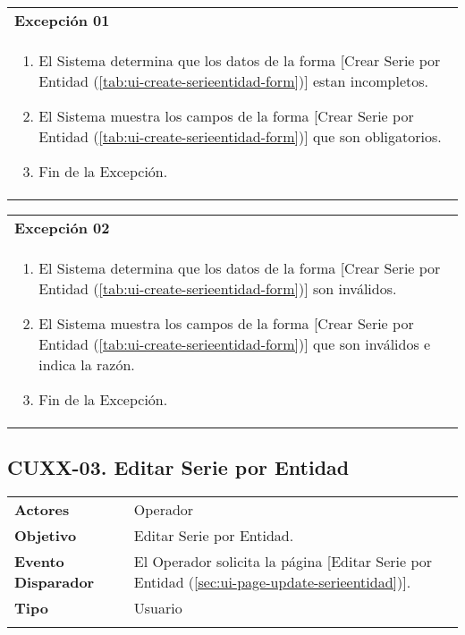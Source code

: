 \begin{tabular}{ p{15.5cm} }
	\textbf{Excepción 01} \\
	\begin{enumerate}
		\item El Sistema determina que los datos de la forma [Crear Serie por Entidad (\ref{tab:ui-create-serieentidad-form})] estan incompletos.
		\item El Sistema muestra los campos de la forma [Crear Serie por Entidad (\ref{tab:ui-create-serieentidad-form})] que son obligatorios.
		\item Fin de la Excepción.
	\end{enumerate}
\end{tabular}

\begin{tabular}{ p{15.5cm} }
	\textbf{Excepción 02} \\
	\begin{enumerate}
		\item El Sistema determina que los datos de la forma [Crear Serie por Entidad (\ref{tab:ui-create-serieentidad-form})] son inválidos.
		\item El Sistema muestra los campos de la forma [Crear Serie por Entidad (\ref{tab:ui-create-serieentidad-form})] que son inválidos e indica la razón.
		\item Fin de la Excepción.
	\end{enumerate}
\end{tabular}


\clearpage
\subsection{CUXX-03. Editar Serie por Entidad} \label{sec:cu-update-SerieEntidad}

\begin{tabular}{ p{3.5cm} p{11.5cm} }
	\textbf{Actores} & Operador\\
	\textbf{Objetivo} & Editar Serie por Entidad.\\
	\textbf{Evento Disparador} & El Operador solicita la página [Editar Serie por Entidad (\ref{sec:ui-page-update-serieentidad})].\\
	\textbf{Tipo} & Usuario\\
	\\
\end{tabular}


